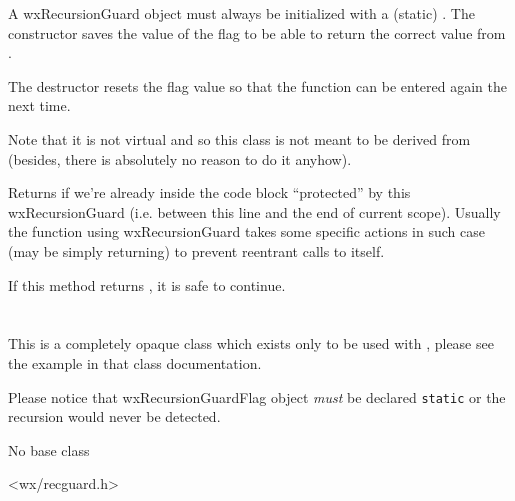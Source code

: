 A wxRecursionGuard object must always be initialized with a (static) 
. The constructor saves the
value of the flag to be able to return the correct value from 
.


\label{wxrecursionguarddtor}


The destructor resets the flag value so that the function can be entered again
the next time.

Note that it is not virtual and so this class is not meant to be derived from
(besides, there is absolutely no reason to do it anyhow).


\label{wxrecursionguardisinside}


Returns \true if we're already inside the code block ``protected'' by this
wxRecursionGuard (i.e. between this line and the end of current scope). Usually
the function using wxRecursionGuard takes some specific actions in such case
(may be simply returning) to prevent reentrant calls to itself.

If this method returns \false, it is safe to continue.



\section{}\label{wxrecursionguardflag}

This is a completely opaque class which exists only to be used with 
, please see the example in that
class documentation.

Please notice that wxRecursionGuardFlag object \emph{must} be declared 
\texttt{static} or the recursion would never be detected.


No base class


<wx/recguard.h>

